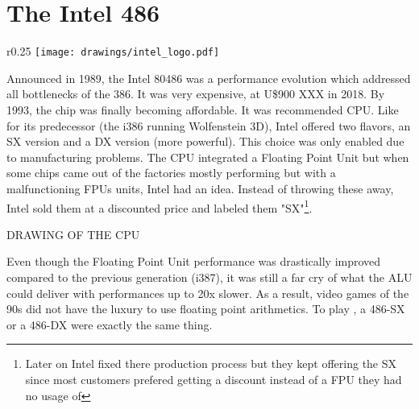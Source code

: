 \section{The Intel 486}

\begin{wrapfigure}[5]{r}{0.25\textwidth}
\centering
\texttt{[image: drawings/intel\_logo.pdf]}
\end{wrapfigure}

Announced in 1989, the Intel 80486 was a performance evolution which addressed all bottlenecks of the 386. It was very expensive, at U\$900 XXX in 2018. By 1993, the chip was finally becoming affordable. It was \doom recommended CPU. Like for its predecessor (the i386 running Wolfenstein 3D), Intel offered two flavors, an SX version and a DX version (more powerful). This choice was only enabled due to manufacturing problems. The CPU integrated a Floating Point Unit but when some chips came out of the factories mostly performing but with a malfunctioning FPUs units, Intel had an idea. Instead of throwing these away, Intel sold them at a discounted price and labeled them "SX"\footnote{Later on Intel fixed there production process but they kept offering the SX since most customers prefered getting a discount instead of a FPU they had no usage of}.\\
\par
 
DRAWING OF THE CPU\\

      \par

Even though the Floating Point Unit performance was drastically improved compared to the previous generation (i387), it was still a far cry of what the ALU could deliver with performances up to 20x slower. As a result, video games of the 90s did not have the luxury to use floating point arithmetics. To play \doom, a 486-SX or a 486-DX were exactly the same thing.\\
\par




